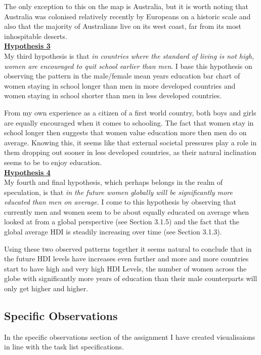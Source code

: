 \documentclass[11pt,a4paper,final]{article}
\begin{document}
\begin{multicols}{2}
The only exception to this on the map is Australia, but it is worth noting that Australia was colonised relatively recently by Europeans on a historic scale and also that the majority of Australians live on its west coast, far from its most inhospitable deserts.
\\
\underline{\textbf{Hypothesis 3}}
\\
My third hypothesis is that \emph{in countries where the standard of living is not high, women are encouraged to quit school earlier than men}. I base this hypothesis on observing the pattern in the male/female mean years education bar chart of women staying in school longer than men in more developed countries and women staying in school shorter than men in less developed countries.

From my own experience as a citizen of a first world country, both boys and girls are equally encouraged when it comes to schooling. The fact that women stay in school longer then suggests that women value education more then men do on average. Knowing this, it seems like that external societal pressures play a role in them dropping out sooner in less developed countries, as their natural inclination seems to be to enjoy education.
\\
\underline{\textbf{Hypothesis 4}}
\\
My fourth and final hypothesis, which perhaps belongs in the realm of speculation, is that \emph{in the future women globally will be significantly more educated than men on average}. I come to this hypothesis by observing that currently men and women seem to be about equally educated on average when looked at from a global perspective (see Section 3.1.5) and the fact that the global average HDI is steadily increasing over time (see Section 3.1.3).

Using these two observed patterns together it seems natural to conclude that in the future HDI levels have increases even further and more and more countries start to have high and very high HDI Levels, the number of women across the globe with significantly more years of education than their male counterparts will only get higher and higher.
\vfill\null
\columnbreak


\subsection{Specific Observations}
In the specific observations section of the assignment I have created visualisaions in line with the task list specifications.


\end{multicols}
\end{document}
